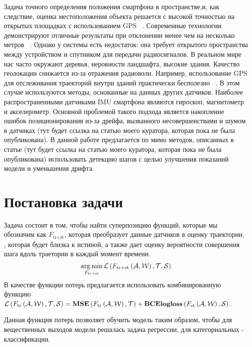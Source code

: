 \documentclass[12pt, twoside]{article}
\begin{document}
Задача точного определения положения смартфона в пространстве,и, как следствие, оценка местоположения объекта решается с высокой точностью на открытых площадках с использованием GPS ~\cite{mohamed1999adaptive}. Современные технологии демонстрируют отличные результаты при отклонении менее чем на несколько метров ~\cite{rahiman2013overview}. Однако у системы есть недостаток: она требует открытого пространства между устройством и спутником для передачи радиосигналов. В реальном мире нас часто окружают деревья, неровности ландшафта, высокие здания. Качество геолокации снижается из-за отражения радиоволн. Например, использование GPS для отслеживания траекторий внутри зданий практически бесполезно ~\cite{dedes2005indoor}. В этом случае используются методы, основанные на данных других датчиков. Наиболее распространенными датчиками IMU смартфона являются гироскоп, магнитометр и акселерометр. Основной проблемой такого подхода является накопление ошибок позиционирования из-за дрейфа, вызванного несовершенствами и шумом в датчиках (тут будет ссылка на статью моего куратора, которая пока не была опубликована). В данной работе предлагается по мимо методов, описанных в статье  (тут будет ссылка на статью моего куратора, которая пока не была опубликована) использовать детекцию шагов с целью улучшения показаний модели и уменьшения дрифта.

\section{Постановка задачи}

Задача состоит в том, чтобы найти суперпозицию функций, которые мы обозначим как $F_{\text{tr+st}}$, которая преобразует данные датчиков в оценку траектории, , которая будет близка к истиной, а также дает оценку вероятности совершения шага вдоль траетории в каждый момент времени.
\begin{equation}
    \label{eq:general_ps}
    \argmin\limits_{F_{\text{tr+st}}}\mathcal{L}\left(F_{\text{tr+st}}\left(\cal{A}, \cal{W}\right), \cal{T}, \cal{S}\right)
\end{equation}{}
\newpage
В качестве функции потерь предлагается использовать комбинированную функцию  $\mathcal{L}\left(F_{\text{tr}}\left(\cal{A}, \cal{W}\right), \cal{T}, \cal{S}\right) = \textbf{MSE}\left(F_{\text{tr}}\left(\cal{A}, \cal{W}\right), \cal{T}\right) + \textbf{BCElogloss}\left(F_{\text{st}}\left(\cal{A}, \cal{W}\right), \cal{S}\right)$.

Данная функция потерь позволяет обучить модель таким образом, чтобы для вещественных выходов модели решалась задача регрессии, для категориальных - классификации. 
\end{document}
